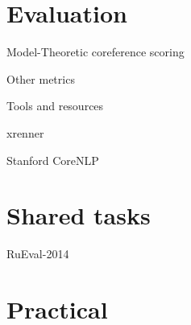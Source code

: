 \documentclass[dvipsnames, 10pt, compress]{beamer}
\begin{document}
\section{Evaluation}


\begin{frame}{Model-Theoretic coreference scoring}


\end{frame}

\begin{frame}{Other metrics}


\end{frame}

\begin{frame}{Tools and resources}


\end{frame}

\begin{frame}{xrenner}

\end{frame}

\begin{frame}{Stanford CoreNLP}

\end{frame}


\section{Shared tasks}

\begin{frame}{RuEval-2014}

\end{frame}

\section{Practical}

\end{document}
